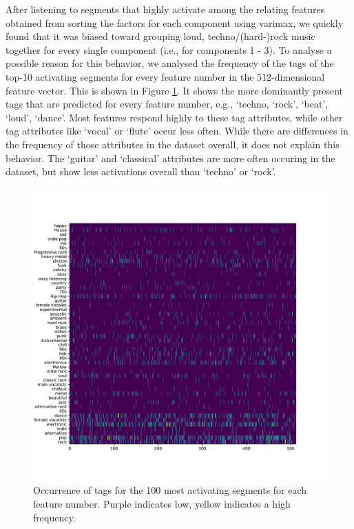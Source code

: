 After listening to segments that highly activate among the relating features obtained from sorting the factors for each component using varimax, we quickly found that it was biased toward grouping loud, techno/(hard-)rock music together for every single component (i.e., for components 1 - 3). To analyse a possible reason for this behavior, we analysed the frequency of the tags of the top-10 activating segments for every feature number in the 512-dimensional feature vector. This is shown in Figure \ref{fig:tag_frequency}. It shows the more dominantly present tags that are predicted for every feature number, e.g., `techno, `rock', `beat', `loud', `dance'. Most features respond highly to these tag attributes, while other tag attributes like `vocal' or `flute' occur less often. While there are differences in the frequency of those attributes in the dataset overall, it does not explain this behavior. The `guitar' and `classical' attributes are more often occuring in the dataset, but show less activations overall than `techno' or `rock'.

\begin{figure}[h]
    \centering
    \includegraphics[width=\textwidth]{figs/features_tags_frequency.pdf}
    \caption{Occurrence of tags for the 100 most activating segments for each feature number. Purple indicates low, yellow indicates a high frequency.}
    \label{fig:tag_frequency}
\end{figure}


